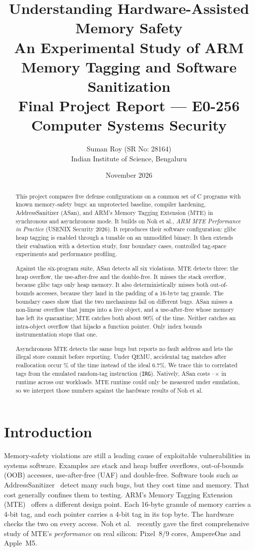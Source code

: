 \documentclass[11pt,a4paper]{article}
\title{\textbf{Understanding Hardware-Assisted Memory Safety}\\[2pt]
\large An Experimental Study of ARM Memory Tagging and Software Sanitization\\[2pt]
\normalsize Final Project Report --- E0-256 Computer Systems Security}
\author{Suman Roy (SR No: 28164)\\ Indian Institute of Science, Bengaluru}
\date{November 2026}
\begin{document}
\maketitle

\begin{abstract}
This project compares five defense configurations on a common set of C programs with known memory-safety bugs:
an unprotected baseline, compiler hardening, AddressSanitizer (ASan), and ARM's Memory Tagging Extension (MTE) in synchronous and asynchronous mode.
It builds on Noh et al., \emph{ARM MTE Performance in Practice} (USENIX Security 2026).
It reproduces their software configuration: glibc heap tagging is enabled through a tunable on an unmodified binary.
It then extends their evaluation with a detection study, four boundary cases, controlled tag-space experiments and performance profiling.

Against the six-program suite, ASan detects all six violations.
MTE detects three: the heap overflow, the use-after-free and the double-free.
It misses the stack overflow, because glibc tags only heap memory.
It also deterministically misses both out-of-bounds accesses, because they land in the padding of a 16-byte tag granule.
The boundary cases show that the two mechanisms fail on different bugs.
ASan misses a non-linear overflow that jumps into a live object, and a use-after-free whose memory has left its quarantine; MTE catches both about 90\% of the time.
Neither catches an intra-object overflow that hijacks a function pointer.
Only index bounds instrumentation stops that one.

Asynchronous MTE detects the same bugs but reports no fault address and lets the illegal store commit before reporting.
Under QEMU, accidental tag matches after reallocation occur \ReuseUndet\% of the time instead of the ideal 6.7\%.
We trace this to correlated tags from the emulated random-tag instruction (\texttt{IRG}).
Natively, ASan costs \AsanMin--\AsanMax$\times$ in runtime across our workloads.
MTE runtime could only be measured under emulation, so we interpret those numbers against the hardware results of Noh et al.
\end{abstract}

\section{Introduction}
Memory-safety violations are still a leading cause of exploitable vulnerabilities in systems software.
Examples are stack and heap buffer overflows, out-of-bounds (OOB) accesses, use-after-free (UAF) and double-free.
Software tools such as AddressSanitizer~\cite{asan} detect many such bugs, but they cost time and memory.
That cost generally confines them to testing.
ARM's Memory Tagging Extension (MTE)~\cite{armmte} offers a different design point.
Each 16-byte granule of memory carries a 4-bit tag, and each pointer carries a 4-bit tag in its top byte.
The hardware checks the two on every access.
Noh et al.~\cite{noh26} recently gave the first comprehensive study of MTE's \emph{performance} on real silicon: Pixel~8/9 cores, AmpereOne and Apple~M5.
\end{document}
